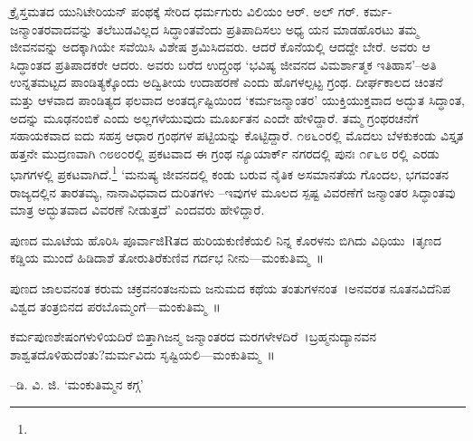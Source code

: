 





ಕ್ರೈಸ್ತಮತದ ಯುನಿಟೇರಿಯನ್ ಪಂಥಕ್ಕೆ ಸೇರಿದ ಧರ್ಮಗುರು ವಿಲಿಯಂ ಆರ್. ಅಲ್ ಗರ್. ಕರ್ಮ-ಜನ್ಮಾಂತರವಾದವನ್ನು ತಲೆಬುಡವಿಲ್ಲದ ಸಿದ್ಧಾಂತವೆಂದು ಪ್ರತಿಪಾದಿಸಲು ಅಧ್ಯ ಯನ ಮಾಡಹೊರಟು ತಮ್ಮ ಜೀವನವನ್ನು ಅದಕ್ಕಾಗಿಯೇ ಸವೆಯಿಸಿ ವಿಶೇಷ ಶ್ರಮಿಸಿದವರು. ಆದರೆ ಕೊನೆಯಲ್ಲಿ ಆದದ್ದೇ ಬೇರೆ. ಅವರು ಆ ಸಿದ್ಧಾಂತದ ಪ್ರತಿಪಾದಕರೇ ಆದರು. ಅವರು ಬರೆದ ಉದ್ಗ್ರಂಥ ‘ಭವಿಷ್ಯ ಜೀವನದ ವಿಮರ್ಶಾತ್ಮಕ ಇತಿಹಾಸ’–ಅತಿ ಉನ್ನತಮಟ್ಟದ ಪಾಂಡಿತ್ಯಕ್ಕೊಂದು ಅದ್ವಿತೀಯ ಉದಾಹರಣೆ ಎಂದು ಹೊಗಳಲ್ಪಟ್ಟ ಗ್ರಂಥ. ದೀರ್ಘಕಾಲದ ಚಿಂತನೆ ಮತ್ತು ಆಳವಾದ ಪಾಂಡಿತ್ಯದ ಫಲವಾದ ಅಂತರ್ದೃಷ್ಟಿಯಿಂದ ‘ಕರ್ಮಜನ್ಮಾಂತರ’ ಯುಕ್ತಿಯುಕ್ತವಾದ ಅದ್ಭುತ ಸಿದ್ಧಾಂತ, ಅದನ್ನು ಮೂಢನಂಬಿಕೆ ಎಂದು ಅಲ್ಲಗಳೆಯುವುದು ಮೂರ್ಖತನ ಎಂದೇ ಹೇಳಿದ್ದಾರೆ. ತಮ್ಮ ಗ್ರಂಥರಚನೆಗೆ ಸಹಾಯಕವಾದ ಐದು ಸಹಸ್ರ ಆಧಾರ ಗ್ರಂಥಗಳ ಪಟ್ಟಿಯನ್ನು ಕೊಟ್ಟಿದ್ದಾರೆ. ೧೮೬೦ರಲ್ಲಿ ಮೊದಲು ಬೆಳಕುಕಂಡು ವಿಸ್ತೃತ ಹತ್ತನೇ ಮುದ್ರಣವಾಗಿ ೧೮೮೦ರಲ್ಲಿ ಪ್ರಕಟವಾದ ಈ ಗ್ರಂಥ ನ್ಯೂಯಾರ್ಕ್ ನಗರದಲ್ಲಿ ಪುನಃ ೧೯೬೮ ರಲ್ಲಿ ಎರಡು ಭಾಗಗಳಲ್ಲಿ ಪ್ರಕಟವಾಗಿದೆ.\footnote{} ‘ಮನುಷ್ಯ ಜೀವನದಲ್ಲಿ ಕಂಡು ಬರುವ ನೈತಿಕ ಅಸಮಾನತೆಯ ಗೊಂದಲ, ಭಗವಂತನ ರಾಜ್ಯದಲ್ಲಿನ ತಾರತಮ್ಯ, ನಾನಾವಿಧವಾದ ದುರಿತಗಳು –ಇವುಗಳ ಮೂಲದ ಸ್ಪಷ್ಟ ವಿವರಣೆಗೆ ಜನ್ಮಾಂತರ ಸಿದ್ಧಾಂತವು ಮಾತ್ರ ಅದ್ಭುತವಾದ ವಿವರಣೆ ನೀಡುತ್ತದೆ’ ಎಂದವರು ಹೇಳಿದ್ದಾರೆ.

ಪುಣದ ಮೂಟೆಯ ಹೊರಿಸಿ ಪೂರ್ವಾಜಿRತದ ಹುರಿಯಕುಣಿಕೆಯಲಿ ನಿನ್ನ ಕೊರಳನು ಬಿಗಿದು ವಿಧಿಯು~।ತೃಣದ ಕಡ್ಡಿಯ ಮುಂದೆ ಹಿಡಿದಾಶೆ ತೋರುತಿರೆಕುಣಿವ ಗರ್ದಭ ನೀನು—ಮಂಕುತಿಮ್ಮ~॥

ಪುಣದ ಜಾಲವನಂತ ಕರುಮ ಚಕ್ರವನಂತಜನುಮ ಜನುಮದ ಕಥೆಯ ತಂತುಗಳನಂತ~।ಅನವರತ ನೂತನವಿದೆನಿಪ ವಿಶ್ವದ ತಂತ್ರಬಿನದ ಪರಬೊಮ್ಮಂಗೆ—ಮಂಕುತಿಮ್ಮ~॥

ಕರ್ಮಪುಣಶೇಷಂಗಳುಳಿಯದಿರೆ ಬಿತ್ತಾಗಿಜನ್ಮ ಜನ್ಮಾಂತರದ ಮರಗಳೇಳದಿರೆ~।ಬ್ರಹ್ಮನುದ್ಯಾನವನ ಶಾಶ್ವತದೊಳಿಹುದೆಂತು?ಮರ್ಮವಿದು ಸೃಷ್ಟಿಯಲಿ—ಮಂಕುತಿಮ್ಮ~॥

–ಡಿ. ವಿ. ಜಿ. ‘ಮಂಕುತಿಮ್ಮನ ಕಗ್ಗ’

